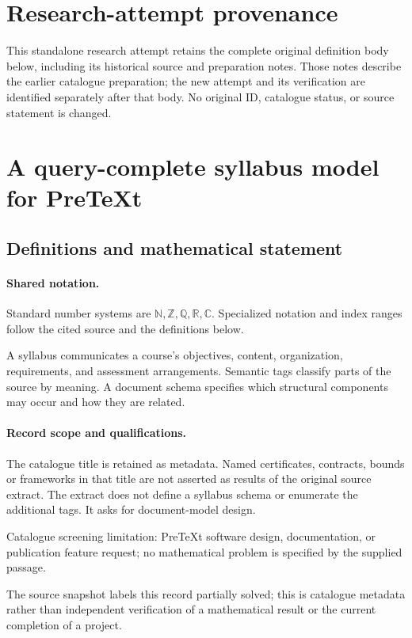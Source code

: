 \documentclass[11pt]{article}
\begin{document}
\section*{Research-attempt provenance}
This standalone research attempt retains the complete original definition body below,
including its historical source and preparation notes. Those notes describe the
earlier catalogue preparation; the new attempt and its verification are identified
separately after that body. No original ID, catalogue status, or source statement is changed.

\section{A query-complete syllabus model for PreTeXt}\label{statement}

\subsection{Definitions and mathematical statement}

\paragraph{Shared notation.}Standard number systems are $\mathbb N,\mathbb Z,\mathbb Q,\mathbb R,\mathbb C$. Specialized notation and index ranges follow the cited source and the definitions below.


A syllabus communicates a course's objectives, content, organization, requirements, and assessment arrangements. Semantic tags classify parts of the source by meaning. A document schema specifies which structural components may occur and how they are related.
\paragraph{Record scope and qualifications.}
The catalogue title is retained as metadata. Named certificates, contracts, bounds or frameworks in that title are not asserted as results of the original source extract.
The extract does not define a syllabus schema or enumerate the additional tags. It asks for document-model design.

Catalogue screening limitation: PreTeXt software design, documentation, or publication feature request; no mathematical problem is specified by the supplied passage.

The source snapshot labels this record partially solved; this is catalogue metadata rather than independent verification of a mathematical result or the current completion of a project.
\end{document}
